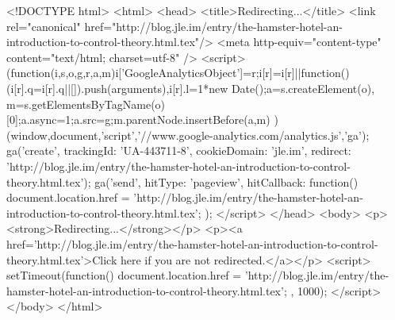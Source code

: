 <!DOCTYPE html>
<html>
<head>
<title>Redirecting...</title>
<link rel="canonical" href="http://blog.jle.im/entry/the-hamster-hotel-an-introduction-to-control-theory.html.tex"/>
<meta http-equiv="content-type" content="text/html; charset=utf-8" />
<script>
(function(i,s,o,g,r,a,m){i['GoogleAnalyticsObject']=r;i[r]=i[r]||function(){
(i[r].q=i[r].q||[]).push(arguments)},i[r].l=1*new Date();a=s.createElement(o),
m=s.getElementsByTagName(o)[0];a.async=1;a.src=g;m.parentNode.insertBefore(a,m)
})(window,document,'script','//www.google-analytics.com/analytics.js','ga');
ga('create', { trackingId: 'UA-443711-8', cookieDomain: 'jle.im', redirect: 'http://blog.jle.im/entry/the-hamster-hotel-an-introduction-to-control-theory.html.tex'});
ga('send', { hitType: 'pageview', hitCallback: function() { document.location.href = 'http://blog.jle.im/entry/the-hamster-hotel-an-introduction-to-control-theory.html.tex'; } });
</script>
</head>
<body>
  <p><strong>Redirecting...</strong></p>
  <p><a href='http://blog.jle.im/entry/the-hamster-hotel-an-introduction-to-control-theory.html.tex'>Click here if you are not redirected.</a></p>
  <script>
    setTimeout(function() { document.location.href = 'http://blog.jle.im/entry/the-hamster-hotel-an-introduction-to-control-theory.html.tex'; }, 1000);
  </script>
</body>
</html>
